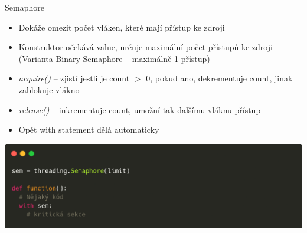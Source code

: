 \documentclass{beamer}
\begin{document}
\begin{frame}[fragile]{Semaphore}
    \begin{itemize}
        \item Dokáže omezit počet vláken, které mají přístup ke zdroji
        \item Konstruktor očekává value, určuje maximální počet přístupů ke zdroji
        \newline (Varianta Binary Semaphore – maximálně 1 přístup)

        \vskip 0.25in
        \item \textit{acquire()} – zjistí jestli je count $>$ 0, pokud ano, dekrementuje count, jinak zablokuje vlákno
        \item \textit{release()} – inkrementuje count, umožní tak dalšímu vláknu přístup
        \item Opět with statement dělá automaticky
    \end{itemize}
    \scriptsize
    \begin{center}
        \includegraphics[width=\textwidth]{obrazky/codes/carbon3.png}
    \end{center}
\end{frame}
\end{document}
